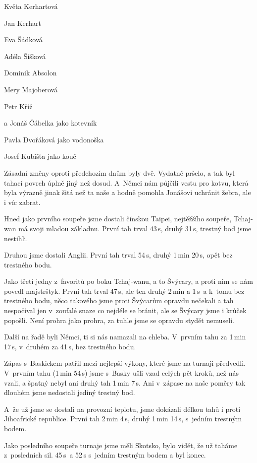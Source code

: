 \documentclass[11pt]{article}
\begin{document}
\vspace*{6pt}
Květa Kerhartová

Jan Kerhart

Eva Šádková

Adéla Šišková

Dominik Absolon

Mery Majoberová

Petr Kříž

a Jonáš Čábelka jako kotevník

\clearpage

Pavla Dvořáková jako vodonoška

Josef Kubišta jako kouč

\vspace*{6pt}

Zásadní změny oproti předchozím dnům byly dvě. Vydatně pršelo, a tak byl tahací povrch úplně jiný než dosud. A~Němci nám půjčili vestu pro kotvu, která byla výrazně jinak šitá než ta naše a hodně pomohla Jonášovi uchránit žebra, ale i víc zabrat.

Hned jako prvního soupeře jsme dostali čínskou Taipei, nejtěžšího soupeře, Tchaj-wan má svoji mladou základnu. První tah trval 43\,s, druhý 31\,s, trestný bod jsme nestihli.

Druhou jsme dostali Anglii. První tah trval 54\,s, druhý 1\,min 20\,s, opět bez trestného bodu.

Jako třetí jedny z~favoritů po boku Tchaj-wanu, a to Švýcary, a proti nim se nám povedl majstrštyk. První tah trval 47\,s, ale ten druhý 2\,min a 1\,s~a k~tomu bez trestného bodu, něco takového jsme proti Švýcarům opravdu nečekali a tah nespočíval jen v~zoufalé snaze co nejdéle se bránit, ale se Švýcary jsme i krůček popošli. Není prohra jako prohra, za tuhle jsme se opravdu stydět nemuseli.

Další na řadě byli Němci, ti si nás namazali na chleba. V~prvním tahu za 1\,min 17\,s, v~druhém za 41\,s, bez trestného bodu.

Zápas s~Baskickem patřil mezi nejlepší výkony, které jsme na turnaji předvedli. V~prvním tahu (1\,min 54\,s) jsme s~Basky ušli vzad celých pět kroků, než nás vzali, a špatný nebyl ani druhý tah 1\,min 7\,s. Ani v~zápase na naše poměry tak dlouhém jsme nedostali jediný trestný bod.

A~že už jsme se dostali na provozní teplotu, jsme dokázali délkou tahů i proti Jihoafrické republice. První tah 2\,min 4\,s, druhý 1\,min 14\,s, s~jedním trestným bodem.

Jako posledního soupeře turnaje jsme měli Skotsko, bylo vidět, že už taháme z~posledních sil. 45\,s~a 52\,s s~jedním trestným bodem a byl konec.
\end{document}
